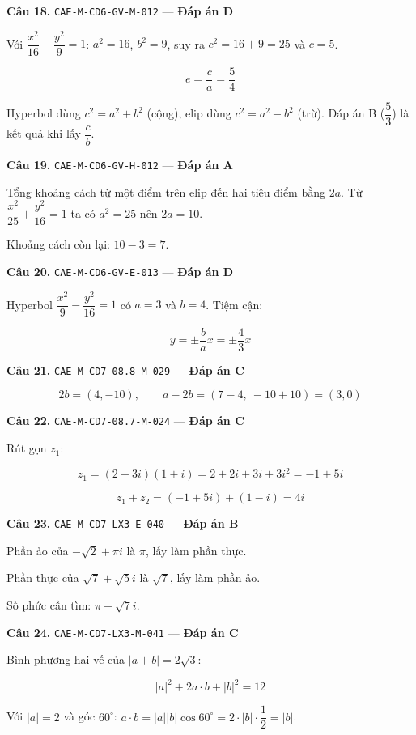 \documentclass[11pt, a4paper]{article}
\begin{document}
\textbf{Câu 18.} \texttt{CAE-M-CD6-GV-M-012} — \textbf{Đáp án D}

Với $\dfrac{x^2}{16} - \dfrac{y^2}{9} = 1$: $a^2 = 16$, $b^2 = 9$, suy ra $c^2 = 16 + 9 = 25$ và $c = 5$.

$$e = \frac{c}{a} = \frac{5}{4}$$

 Hyperbol dùng $c^2 = a^2 + b^2$ (cộng), elip dùng $c^2 = a^2 - b^2$ (trừ). Đáp án B ($\dfrac{5}{3}$) là kết quả khi lấy $\dfrac{c}{b}$.

\textbf{Câu 19.} \texttt{CAE-M-CD6-GV-H-012} — \textbf{Đáp án A}

Tổng khoảng cách từ một điểm trên elip đến hai tiêu điểm bằng $2a$. Từ $\dfrac{x^2}{25} + \dfrac{y^2}{16} = 1$ ta có $a^2 = 25$ nên $2a = 10$.

Khoảng cách còn lại: $10 - 3 = 7$.

\textbf{Câu 20.} \texttt{CAE-M-CD6-GV-E-013} — \textbf{Đáp án D}

Hyperbol $\dfrac{x^2}{9} - \dfrac{y^2}{16} = 1$ có $a = 3$ và $b = 4$. Tiệm cận:

$$y = \pm\frac{b}{a}x = \pm\frac{4}{3}x$$

\textbf{Câu 21.} \texttt{CAE-M-CD7-08.8-M-029} — \textbf{Đáp án C}

$$2b = (4, -10), \qquad a - 2b = (7 - 4,\ -10 + 10) = (3, 0)$$

\textbf{Câu 22.} \texttt{CAE-M-CD7-08.7-M-024} — \textbf{Đáp án C}

Rút gọn $z_1$:

$$z_1 = (2 + 3i)(1 + i) = 2 + 2i + 3i + 3i^2 = -1 + 5i$$

$$z_1 + z_2 = (-1 + 5i) + (1 - i) = 4i$$

\textbf{Câu 23.} \texttt{CAE-M-CD7-LX3-E-040} — \textbf{Đáp án B}

Phần ảo của $-\sqrt{2} + \pi i$ là $\pi$, lấy làm phần thực.

Phần thực của $\sqrt{7} + \sqrt{5}i$ là $\sqrt{7}$, lấy làm phần ảo.

Số phức cần tìm: $\pi + \sqrt{7}i$.

\textbf{Câu 24.} \texttt{CAE-M-CD7-LX3-M-041} — \textbf{Đáp án C}

Bình phương hai vế của $\lvert a + b \rvert = 2\sqrt{3}$:

$$\lvert a \rvert^2 + 2a \cdot b + \lvert b \rvert^2 = 12$$

Với $\lvert a \rvert = 2$ và góc $60^\circ$: $a \cdot b = \lvert a \rvert\lvert b \rvert\cos 60^\circ = 2 \cdot \lvert b \rvert \cdot \dfrac{1}{2} = \lvert b \rvert$.
\end{document}
